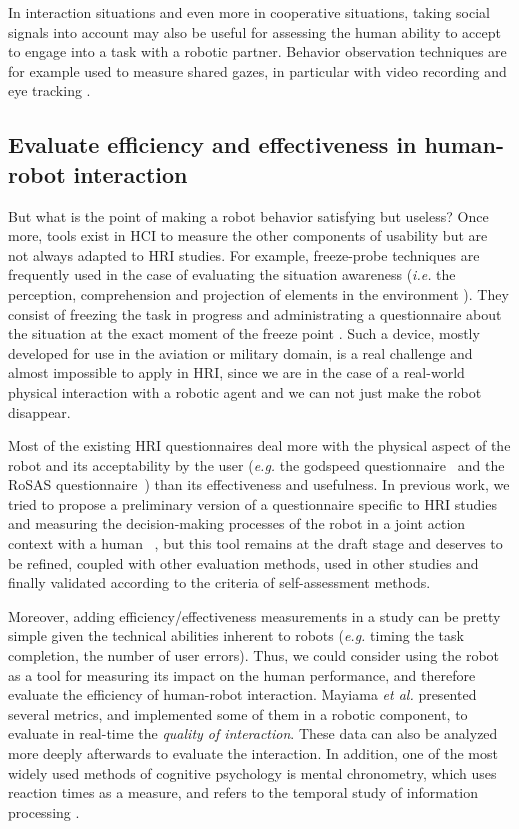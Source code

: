 \documentclass[a4paper,11pt,twoside]{StyleThese}
\begin{document}
In interaction situations and even more in cooperative situations, taking social signals into account may also be useful for assessing the human ability to accept to engage into a task with a robotic partner. Behavior observation techniques are for example used to measure shared gazes, in particular with video recording and eye tracking \cite{gharbi2015toward}.

\subsection{Evaluate efficiency and effectiveness in human-robot interaction}
But what is the point of making a robot behavior satisfying but useless? 
Once more, tools exist in HCI to measure the other components of usability but are not always adapted to HRI studies. For example, freeze-probe techniques are frequently used in the case of evaluating the situation awareness (\textit{i.e.} the perception, comprehension and projection of elements in the environment \cite{endsley_design_1988}). They consist of freezing the task in progress and administrating a questionnaire about the situation at the exact moment of the freeze point \cite{salmon2006situation}. Such a device, mostly developed for use in the aviation or military domain, is a real challenge and almost impossible to apply in HRI, since we are in the case of a real-world physical interaction with a robotic agent and we can not just make the robot disappear.

Most of the existing HRI questionnaires deal more with the physical aspect of the robot and its acceptability by the user (\textit{e.g.} the godspeed questionnaire~\cite{bartneck2009measurement} and the RoSAS questionnaire~\cite{carpinella2017robotic}) than its effectiveness and usefulness.
In previous work, we tried to propose a preliminary version of a questionnaire specific to HRI studies and measuring the decision-making processes of the robot in a joint action context with a human~ \cite{devin_evaluating_2018}, but this tool remains at the draft stage and deserves to be refined, coupled with other evaluation methods, used in other studies and finally validated according to the criteria of self-assessment methods.

Moreover, adding efficiency/effectiveness measurements in a study can be pretty simple given the technical abilities inherent to robots (\textit{e.g.} timing the task completion, the number of user errors). Thus, we could consider using the robot as a tool for measuring its impact on the human performance, and therefore evaluate the efficiency of human-robot interaction. Mayiama \textit{et al.} presented several metrics, and implemented some of them in a robotic component, to evaluate in real-time the \textit{quality of interaction}. These data can also be analyzed more deeply afterwards to evaluate the interaction. In addition, one of the most widely used methods of cognitive psychology is mental chronometry, which uses reaction times as a measure, and refers to the temporal study of information processing \cite{posner1978chronometric}.
\end{document}
